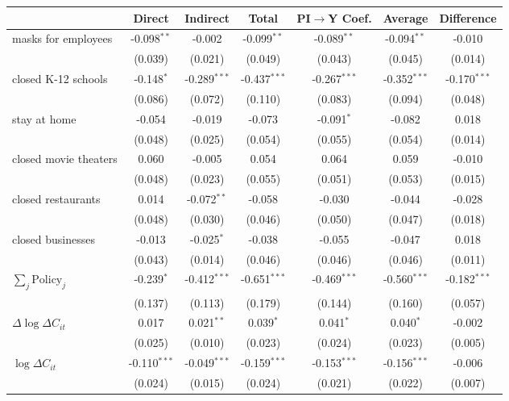 
\begin{tabular}{lccccc|>{}c}
\toprule
  & Direct & Indirect & Total & PI$\to$Y Coef. & Average & Difference\\
\midrule
masks for employees & -0.098$^{**}$ & -0.002 & -0.099$^{**}$ & -0.089$^{**}$ & -0.094$^{**}$ & -0.010\\
 & (0.039) & (0.021) & (0.049) & (0.043) & (0.045) & (0.014)\\
closed K-12 schools & -0.148$^{*}$ & -0.289$^{***}$ & -0.437$^{***}$ & -0.267$^{***}$ & -0.352$^{***}$ & -0.170$^{***}$\\
 & (0.086) & (0.072) & (0.110) & (0.083) & (0.094) & (0.048)\\
stay at home & -0.054 & -0.019 & -0.073 & -0.091$^{*}$ & -0.082 & 0.018\\
 & (0.048) & (0.025) & (0.054) & (0.055) & (0.054) & (0.014)\\
closed movie theaters & 0.060 & -0.005 & 0.054 & 0.064 & 0.059 & -0.010\\
 & (0.048) & (0.023) & (0.055) & (0.051) & (0.053) & (0.015)\\
closed restaurants & 0.014 & -0.072$^{**}$ & -0.058 & -0.030 & -0.044 & -0.028\\
 & (0.048) & (0.030) & (0.046) & (0.050) & (0.047) & (0.018)\\
closed businesses & -0.013 & -0.025$^{*}$ & -0.038 & -0.055 & -0.047 & 0.018\\
 & (0.043) & (0.014) & (0.046) & (0.046) & (0.046) & (0.011)\\
$\sum_j \mathrm{Policy}_j$ & -0.239$^{*}$ & -0.412$^{***}$ & -0.651$^{***}$ & -0.469$^{***}$ & -0.560$^{***}$ & -0.182$^{***}$\\
 & (0.137) & (0.113) & (0.179) & (0.144) & (0.160) & (0.057)\\
$\Delta \log \Delta C_{it}$ & 0.017 & 0.021$^{**}$ & 0.039$^{*}$ & 0.041$^{*}$ & 0.040$^{*}$ & -0.002\\
 & (0.025) & (0.010) & (0.023) & (0.024) & (0.023) & (0.005)\\
$\log \Delta C_{it}$ & -0.110$^{***}$ & -0.049$^{***}$ & -0.159$^{***}$ & -0.153$^{***}$ & -0.156$^{***}$ & -0.006\\
 & (0.024) & (0.015) & (0.024) & (0.021) & (0.022) & (0.007)\\
\bottomrule
\end{tabular}